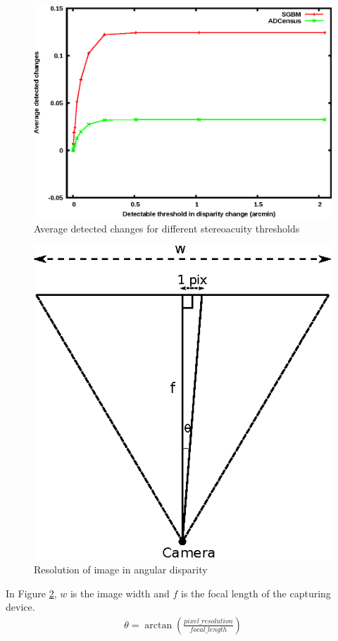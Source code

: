\begin{figure}[H]
\centering
\includegraphics{algthreshBoth}
\caption{Average detected changes for different stereoacuity thresholds}
\label{fig:algthresh}
\end{figure} 

\begin{figure}[H]
\centering
\includegraphics{camRes}
\caption{Resolution of image in angular disparity}
\label{fig:camResolution}
\end{figure}
\noindent
In Figure \ref{fig:camResolution}, $w$ is the image width and $f$ is the focal length of the capturing device.
\begin{align}
\label{eq:algResolution}
\theta = \arctan(\frac{pixel\_resolution}{focal\_length})
\end{align}

